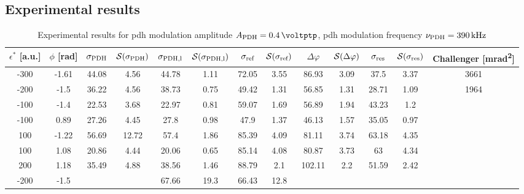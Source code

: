 \begin{landscape}
	\chapter{Experimental results}
	
	\label{app-exp}
	
	
	\begin{table}
	\centering
	\begin{tabular}{|c|c|c|c|c|c|c|c|c|c|c|c|c|}
		\hline
		$\epsilon^*$ [a.u.] & $\phi$ [\si{\radian}] & $\sigma_{\text{PDH}}$ & $\mathcal{S}(\sigma_{\text{PDH}})$ & $\sigma_{\text{PDH,l}}$ & $\mathcal{S}(\sigma_{\text{PDH,l}})$  & $\sigma_{\text{ref}}$ & $\mathcal{S}(\sigma_{\text{ref}})$ & $\Delta \varphi$ & $\mathcal{S}(\Delta \varphi)$ & $\sigma_{\text{res}}$  & $\mathcal{S}(\sigma_{\text{res}})$ & Challenger [\si{\milli\radian\squared}] \\
		\hline
		\hline
		-300 & -1.61 & 44.08 & 4.56 & 44.78 & 1.11 & 72.05 & 3.55 & 86.93 & 3.09 & 37.5 & 3.37 & 3661\\
		-200 & -1.5 & 36.22 & 4.56 & 38.73 & 0.75 & 49.42 & 1.31 & 56.85 & 1.31 & 28.71 & 1.09 & 1964\\
		-100 & -1.4 & 22.53 & 3.68 & 22.97 & 0.81 & 59.07 & 1.69 & 56.89 & 1.94 & 43.23 & 1.2 & \\
		-100 & 0.89 & 27.26 & 4.45 & 27.8 & 0.98 & 47.9 & 1.37 & 46.13 & 1.57 & 35.05 & 0.97 & \\
		100 & -1.22 & 56.69 & 12.72 & 57.4 & 1.86 & 85.39 & 4.09 & 81.11 & 3.74 & 63.18 & 4.35 & \\
		100 & 1.08 & 20.86 & 4.44 & 20.06 & 0.65 & 85.14 & 4.08 & 80.87 & 3.73 & 63 & 4.34 & \\
		200 & 1.18 & 35.49 & 4.88 & 38.56 & 1.46 & 88.79 & 2.1 & 102.11 & 2.2 & 51.59 & 2.42 & \\
		\hline
		\hline
		-200 & -1.5 & & & 67.66 & 19.3 & 66.43 & 12.8 & & & & & \\
		\hline
	\end{tabular}
	\caption{Experimental results for \gls{pdh} modulation amplitude $\tind{A}{PDH} = \SI{0.4}{\voltptp}$, \gls{pdh} modulation frequency $\nu_{\text{PDH}} = \SI{390}{\kilo\hertz}$}
	\end{table}
	
	

\end{landscape}
